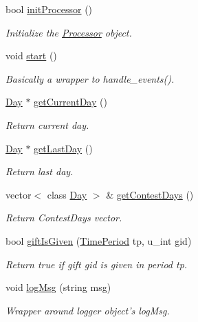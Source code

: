\begin{CompactItemize}
bool \hyperlink{classContest_Contesta13}{init\-Processor} ()
\begin{CompactList}\small\item\em Initialize the \hyperlink{classProcessor}{Processor} object.\item\end{CompactList}\item 
void \hyperlink{classContest_Contesta14}{start} ()
\begin{CompactList}\small\item\em Basically a wrapper to handle\_\-events().\item\end{CompactList}\item 
\hyperlink{classDay}{Day} $\ast$ \hyperlink{classContest_Contesta15}{get\-Current\-Day} ()
\begin{CompactList}\small\item\em Return current day.\item\end{CompactList}\item 
\hyperlink{classDay}{Day} $\ast$ \hyperlink{classContest_Contesta16}{get\-Last\-Day} ()
\begin{CompactList}\small\item\em Return last day.\item\end{CompactList}\item 
vector$<$ class \hyperlink{classDay}{Day} $>$ \& \hyperlink{classContest_Contesta17}{get\-Contest\-Days} ()
\begin{CompactList}\small\item\em Return Contest\-Days vector.\item\end{CompactList}\item 
bool \hyperlink{classContest_Contesta18}{gift\-Is\-Given} (\hyperlink{classTimePeriod}{Time\-Period} tp, u\_\-int gid)
\begin{CompactList}\small\item\em Return true if gift gid is given in period tp.\item\end{CompactList}\item 
void \hyperlink{classContest_Contesta19}{log\-Msg} (string msg)
\begin{CompactList}\small\item\em Wrapper around logger object's log\-Msg.\item\end{CompactList}\end{CompactItemize}
